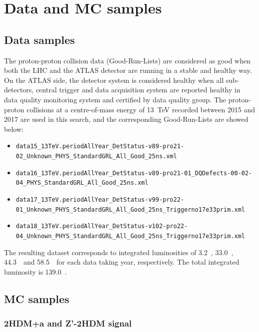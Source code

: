 \chapter{Data and MC samples}
\label{ch:ana-intro}

\section{Data samples}

\par The proton-proton collision data (Good-Run-Lists) are considered as good when both the LHC and the ATLAS detector are running in a stable and healthy way.
On the ATLAS side, the detector system is considered healthy when all sub-detectors, central trigger and data acquisition system are reported healthy in data quality monitoring system and certified by data quality group. 
The proton-proton collisions at a centre-of-mass energy of 13~TeV recorded between 2015 and 2017 are used in this search, and the corresponding Good-Run-Lists are showed below: 

\begin{itemize}
	\tiny
	\item \texttt{data15\_13TeV.periodAllYear\_DetStatus-v89-pro21-02\_Unknown\_PHYS\_StandardGRL\_All\_Good\_25ns.xml}
	\item \texttt{data16\_13TeV.periodAllYear\_DetStatus-v89-pro21-01\_DQDefects-00-02-04\_PHYS\_StandardGRL\_All\_Good\_25ns.xml}
	\item \texttt{data17\_13TeV.periodAllYear\_DetStatus-v99-pro22-01\_Unknown\_PHYS\_StandardGRL\_All\_Good\_25ns\_Triggerno17e33prim.xml}
	\item \texttt{data18\_13TeV.periodAllYear\_DetStatus-v102-pro22-04\_Unknown\_PHYS\_StandardGRL\_All\_Good\_25ns\_Triggerno17e33prim.xml}
\end{itemize}

\par The resulting dataset corresponds to integrated luminosities of 3.2~\ifb, 33.0~\ifb, 44.3~\ifb\ and 58.5~\ifb\ for each data taking year, respectively. 
The total integrated luminosity is 139.0~\ifb.

\section{MC samples}
\label{ch:data-mc-samples}

\subsection{2HDM+a and Z'-2HDM signal}
\label{subsec:signal}

